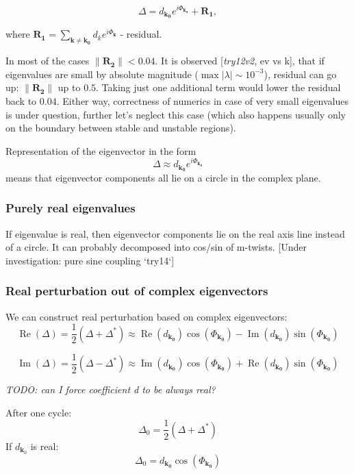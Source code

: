 \documentclass[a4paper,12pt]{article}
\newcommand{\D}{\Delta}%
\begin{document}
$$
\D = d_{\mathbf{k_0}} e^{i \Phi_\mathbf{k_0}}  + \mathbf{R_1},
$$

where $\mathbf{R_1} = \sum_{\mathbf{\mathbf{k} \neq \mathbf{k_0}}} d_k e^{i \Phi_\mathbf{k}}$ - residual.

In most of the cases $\lVert \mathbf{R_2} \rVert < 0.04$. It is observed [\textit{try12v2}, ev vs k], that if eigenvalues are small by absolute magnitude ($\max|\lambda| \sim  10^{-3}$), residual can go up: $\lVert \mathbf{R_2} \rVert$ up to $0.5$. Taking just one additional term would lower the residual back to $0.04$. Either way, correctness of numerics in case of very small eigenvalues is under question, further let's neglect this case (which also happens usually only on the boundary between stable and unstable regions).

Representation of the eigenvector in the form
$$
\D \approx d_{\mathbf{k_0}} e^{i \Phi_\mathbf{k_0}}
$$
means that eigenvector components all lie on a circle in the complex plane.

\subsubsection*{Purely real eigenvalues}

If eigenvalue is real, then eigenvector components lie on the real axis line instead of a circle. It can probably decomposed into cos/sin of m-twists. [Under investigation: pure sine coupling `try14`]

\subsubsection*{Real perturbation out of complex eigenvectors}

We can construct real perturbation based on complex eigenvectors:
$$
\operatorname{Re}(\D)
= \frac{1}{2} ( \D + \D^*) 
\approx  \operatorname{Re}(d_{\mathbf{k_0}}) \cos(\Phi_{\mathbf{k_0}}) - \operatorname{Im}(d_{\mathbf{k_0}}) \sin(\Phi_{\mathbf{k_0}})
$$

$$
\operatorname{Im}(\D)
= \frac{1}{2} ( \D - \D^*)
\approx  \operatorname{Im}(d_{\mathbf{k_0}}) \cos(\Phi_{\mathbf{k_0}}) + \operatorname{Re}(d_{\mathbf{k_0}}) \sin(\Phi_{\mathbf{k_0}})
$$

\emph{TODO: can I force coefficient d to be always real?
}

After one cycle:
$$
\D_0 = \frac{1}{2} (\D + \D^*) 
$$
If $d_{\mathbf{k}_0}$ is real:
$$
\D_0 =  d_{\mathbf{k_0}} \cos(\Phi_{\mathbf{k_0}})
$$
\end{document}
